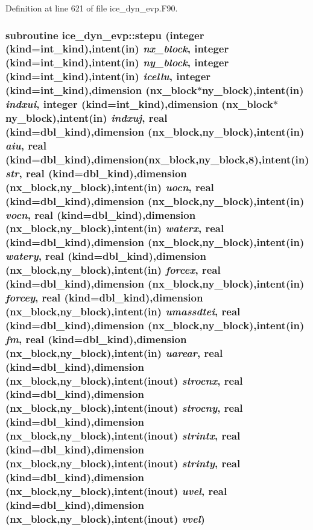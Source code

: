 Definition at line 621 of file ice\_\-dyn\_\-evp.F90.\hypertarget{namespaceice__dyn__evp_ac9b44f5692202d76ab19930c44aa8766}{
\subsubsection[{stepu}]{\setlength{\rightskip}{0pt plus 5cm}subroutine ice\_\-dyn\_\-evp::stepu (integer (kind=int\_\-kind),intent(in) {\em nx\_\-block}, \/  integer (kind=int\_\-kind),intent(in) {\em ny\_\-block}, \/  integer (kind=int\_\-kind),intent(in) {\em icellu}, \/  integer (kind=int\_\-kind),dimension (nx\_\-block$\ast$ny\_\-block),intent(in) {\em indxui}, \/  integer (kind=int\_\-kind),dimension (nx\_\-block$\ast$ny\_\-block),intent(in) {\em indxuj}, \/  real (kind=dbl\_\-kind),dimension (nx\_\-block,ny\_\-block),intent(in) {\em aiu}, \/  real (kind=dbl\_\-kind),dimension(nx\_\-block,ny\_\-block,8),intent(in) {\em str}, \/  real (kind=dbl\_\-kind),dimension (nx\_\-block,ny\_\-block),intent(in) {\em uocn}, \/  real (kind=dbl\_\-kind),dimension (nx\_\-block,ny\_\-block),intent(in) {\em vocn}, \/  real (kind=dbl\_\-kind),dimension (nx\_\-block,ny\_\-block),intent(in) {\em waterx}, \/  real (kind=dbl\_\-kind),dimension (nx\_\-block,ny\_\-block),intent(in) {\em watery}, \/  real (kind=dbl\_\-kind),dimension (nx\_\-block,ny\_\-block),intent(in) {\em forcex}, \/  real (kind=dbl\_\-kind),dimension (nx\_\-block,ny\_\-block),intent(in) {\em forcey}, \/  real (kind=dbl\_\-kind),dimension (nx\_\-block,ny\_\-block),intent(in) {\em umassdtei}, \/  real (kind=dbl\_\-kind),dimension (nx\_\-block,ny\_\-block),intent(in) {\em fm}, \/  real (kind=dbl\_\-kind),dimension (nx\_\-block,ny\_\-block),intent(in) {\em uarear}, \/  real (kind=dbl\_\-kind),dimension (nx\_\-block,ny\_\-block),intent(inout) {\em strocnx}, \/  real (kind=dbl\_\-kind),dimension (nx\_\-block,ny\_\-block),intent(inout) {\em strocny}, \/  real (kind=dbl\_\-kind),dimension (nx\_\-block,ny\_\-block),intent(inout) {\em strintx}, \/  real (kind=dbl\_\-kind),dimension (nx\_\-block,ny\_\-block),intent(inout) {\em strinty}, \/  real (kind=dbl\_\-kind),dimension (nx\_\-block,ny\_\-block),intent(inout) {\em uvel}, \/  real (kind=dbl\_\-kind),dimension (nx\_\-block,ny\_\-block),intent(inout) {\em vvel})}}
\label{namespaceice__dyn__evp_ac9b44f5692202d76ab19930c44aa8766}


